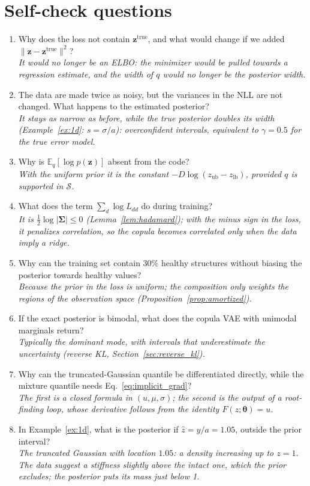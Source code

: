 \documentclass[11pt,a4paper]{article}
\numberwithin{equation}{section}
\theoremstyle{plain}
\theoremstyle{definition}
\theoremstyle{remark}
\newcommand{\z}{\mathbf{z}}
\newcommand{\thetab}{\bm{\theta}}
\newcommand{\Sig}{\bm{\Sigma}}
\newcommand{\Sset}{\mathcal{S}}
\newcommand{\E}{\mathbb{E}}
\newcommand{\zlb}{z_{\text{lb}}}
\newcommand{\zub}{z_{\text{ub}}}
\begin{document}
\section{Self-check questions}
\begin{enumerate}
\item Why does the loss not contain $\z^{\text{true}}$, and what would change if we added $\|\z-\z^{\text{true}}\|^2$? \\
\emph{It would no longer be an ELBO: the minimizer would be pulled towards a regression estimate, and the width of $q$ would no longer be the posterior width.}
\item The data are made twice as noisy, but the variances in the NLL are not changed. What happens to the estimated posterior? \\
\emph{It stays as narrow as before, while the true posterior doubles its width (Example~\ref{ex:1d}: $s=\sigma/a$): overconfident intervals, equivalent to $\gamma=0.5$ for the true error model.}
\item Why is $\E_q[\log p(\z)]$ absent from the code? \\
\emph{With the uniform prior it is the constant $-D\log(\zub-\zlb)$, provided $q$ is supported in $\Sset$.}
\item What does the term $\sum_d\log L_{dd}$ do during training? \\
\emph{It is $\tfrac12\log|\Sig|\le0$ (Lemma~\ref{lem:hadamard}); with the minus sign in the loss, it penalizes correlation, so the copula becomes correlated only when the data imply a ridge.}
\item Why can the training set contain 30\% healthy structures without biasing the posterior towards healthy values? \\
\emph{Because the prior in the loss is uniform; the composition only weights the regions of the observation space (Proposition~\ref{prop:amortized}).}
\item If the exact posterior is bimodal, what does the copula VAE with unimodal marginals return? \\
\emph{Typically the dominant mode, with intervals that underestimate the uncertainty (reverse KL, Section~\ref{sec:reverse_kl}).}
\item Why can the truncated-Gaussian quantile be differentiated directly, while the mixture quantile needs Eq.~\eqref{eq:implicit_grad}? \\
\emph{The first is a closed formula in $(u,\mu,\sigma)$; the second is the output of a root-finding loop, whose derivative follows from the identity $F(z;\thetab)=u$.}
\item In Example~\ref{ex:1d}, what is the posterior if $\hat z=y/a=1.05$, outside the prior interval? \\
\emph{The truncated Gaussian with location $1.05$: a density increasing up to $z=1$. The data suggest a stiffness slightly above the intact one, which the prior excludes; the posterior puts its mass just below 1.}
\end{enumerate}
\end{document}
